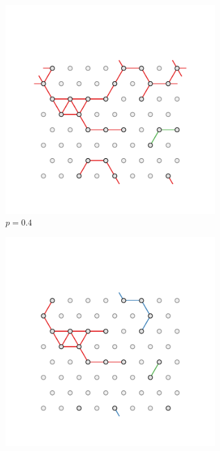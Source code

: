 \begin{figure}[bt]
     \vspace{0.2cm}
          \begin{subfigure}[b]{0.3\textwidth}
         \centering
         \includegraphics[width=\textwidth]{./figures/targeted_opt/perc_tri_4.pdf}
         \caption{$p=0.4$}
         \label{fig:perctri4}
     \end{subfigure}
     \hfill
      \begin{subfigure}[b]{0.3\textwidth}
         \centering
         \includegraphics[width=\textwidth]{./figures/targeted_opt/perc_tri_3.pdf}

\end{subfigure}
\end{figure}
